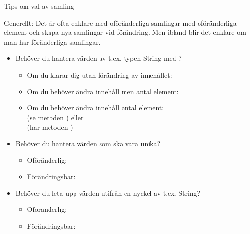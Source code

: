 \begin{Slide}{Tips om val av samling}\SlideFontSmall

Generellt: Det är ofta enklare med oföränderliga samlingar med oföränderliga element och skapa nya samlingar vid förändring. Men ibland blir det enklare om man har föränderliga samlingar.

\begin{itemize}
\item Behöver du hantera värden  av t.ex. typen String med ?
\begin{itemize}\SlideFontTiny
\item Om du klarar dig utan förändring av innehållet:\\ 
\item Om du behöver ändra innehåll men  antal element: \\  
\item Om du behöver ändra innehåll  antal element: 
\\  (se metoden ) eller \\  (har metoden )
\end{itemize}

\item Behöver du hantera värden  som ska vara unika?
\begin{itemize}\SlideFontTiny
\item Oföränderlig: 
\item Förändringsbar: 
\end{itemize}

\item Behöver du leta upp värden  utifrån en nyckel av t.ex. String?
\begin{itemize}\SlideFontTiny
\item Oföränderlig: 
\item Förändringsbar: 
\end{itemize}


\end{itemize}
\end{Slide}

